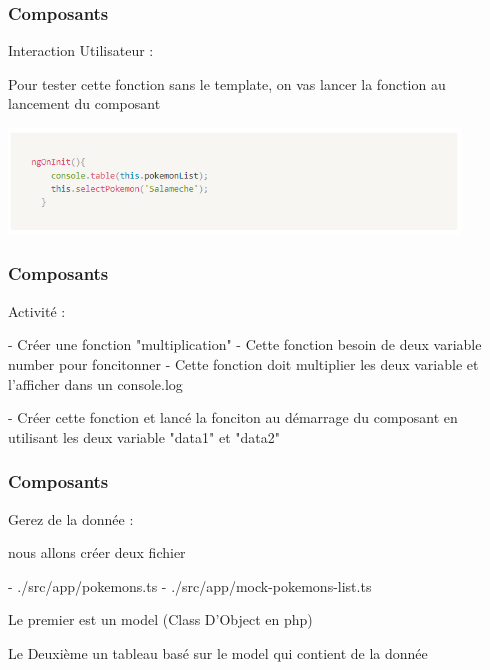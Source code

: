 \documentclass[10pt]{beamer}
\begin{document}
	\begin{frame}
		\frametitle{Composants}

		Interaction Utilisateur : \newline \newline

		Pour tester cette fonction sans le template, on vas lancer la fonction au lancement du composant

		\centering
		\includegraphics[width=12cm]{assets/userInt2} \newline


	\end{frame}

	\begin{frame}
		\frametitle{Composants}

		Activité : \newline \newline

		- Créer une fonction "multiplication" \newline
		- Cette fonction besoin de deux variable number pour foncitonner \newline
		- Cette fonction doit multiplier les deux variable et l'afficher dans un console.log \newline

		- Créer cette fonction et lancé la fonciton au démarrage du composant \newline en utilisant les deux variable "data1" et "data2"


	\end{frame}

	\begin{frame}
		\frametitle{Composants}

		Gerez de la donnée : \newline \newline

		nous allons créer deux fichier \newline \newline

		- ./src/app/pokemons.ts \newline
		- ./src/app/mock-pokemons-list.ts \newline \newline

		Le premier est un model (Class D'Object en php) \newline \newline

		Le Deuxième un tableau basé sur le model qui contient de la donnée

	\end{frame}
\end{document}
